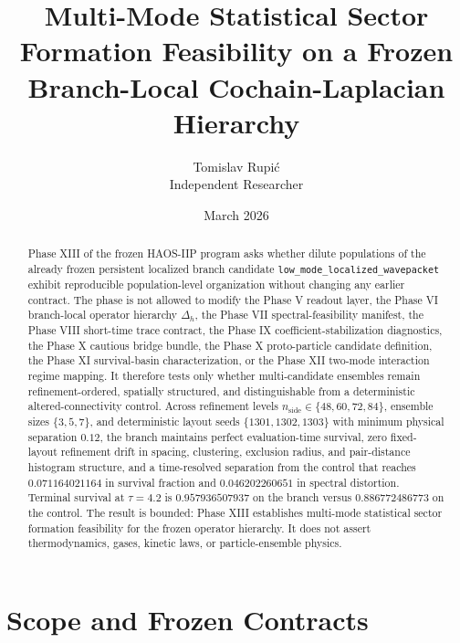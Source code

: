 \documentclass[11pt]{article}
\title{Multi-Mode Statistical Sector Formation Feasibility on a Frozen Branch-Local Cochain-Laplacian Hierarchy}
\author{Tomislav Rupi\'c \\ Independent Researcher}
\date{March 2026}
\begin{document}
\maketitle

\begin{abstract}
Phase XIII of the frozen HAOS-IIP program asks whether dilute populations of the already frozen persistent localized branch candidate
\texttt{low\_mode\_localized\_wavepacket} exhibit reproducible population-level organization without changing any earlier contract. The phase is not allowed to modify the Phase V readout layer, the Phase VI branch-local operator hierarchy $\Delta_h$, the Phase VII spectral-feasibility manifest, the Phase VIII short-time trace contract, the Phase IX coefficient-stabilization diagnostics, the Phase X cautious bridge bundle, the Phase X proto-particle candidate definition, the Phase XI survival-basin characterization, or the Phase XII two-mode interaction regime mapping. It therefore tests only whether multi-candidate ensembles remain refinement-ordered, spatially structured, and distinguishable from a deterministic altered-connectivity control. Across refinement levels $n_{\mathrm{side}}\in\{48,60,72,84\}$, ensemble sizes $\{3,5,7\}$, and deterministic layout seeds $\{1301,1302,1303\}$ with minimum physical separation $0.12$, the branch maintains perfect evaluation-time survival, zero fixed-layout refinement drift in spacing, clustering, exclusion radius, and pair-distance histogram structure, and a time-resolved separation from the control that reaches $0.071164021164$ in survival fraction and $0.046202260651$ in spectral distortion. Terminal survival at $\tau=4.2$ is $0.957936507937$ on the branch versus $0.886772486773$ on the control. The result is bounded: Phase XIII establishes multi-mode statistical sector formation feasibility for the frozen operator hierarchy. It does not assert thermodynamics, gases, kinetic laws, or particle-ensemble physics.
\end{abstract}

\section{Scope and Frozen Contracts}
\end{document}
